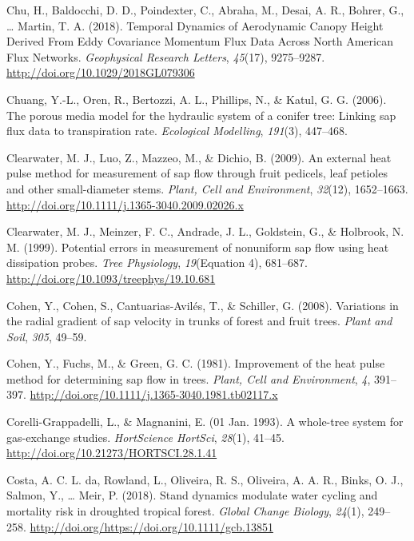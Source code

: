 \documentclass[11pt,twoside]{reedthesis}
\begin{document}
\hypertarget{ref-chu_temporal_2018}{}
Chu, H., Baldocchi, D. D., Poindexter, C., Abraha, M., Desai, A. R.,
Bohrer, G., \ldots{} Martin, T. A. (2018). Temporal Dynamics of
Aerodynamic Canopy Height Derived From Eddy Covariance Momentum Flux
Data Across North American Flux Networks. \emph{Geophysical Research
Letters}, \emph{45}(17), 9275--9287.
\url{http://doi.org/10.1029/2018GL079306}

\hypertarget{ref-Chuang2006}{}
Chuang, Y.-L., Oren, R., Bertozzi, A. L., Phillips, N., \& Katul, G. G.
(2006). The porous media model for the hydraulic system of a conifer
tree: Linking sap flux data to transpiration rate. \emph{Ecological
Modelling}, \emph{191}(3), 447--468.

\hypertarget{ref-Clearwater2009}{}
Clearwater, M. J., Luo, Z., Mazzeo, M., \& Dichio, B. (2009). An
external heat pulse method for measurement of sap flow through fruit
pedicels, leaf petioles and other small-diameter stems. \emph{Plant,
Cell and Environment}, \emph{32}(12), 1652--1663.
\url{http://doi.org/10.1111/j.1365-3040.2009.02026.x}

\hypertarget{ref-Clearwater1999}{}
Clearwater, M. J., Meinzer, F. C., Andrade, J. L., Goldstein, G., \&
Holbrook, N. M. (1999). Potential errors in measurement of nonuniform
sap flow using heat dissipation probes. \emph{Tree Physiology},
\emph{19}(Equation 4), 681--687.
\url{http://doi.org/10.1093/treephys/19.10.681}

\hypertarget{ref-Cohen2008}{}
Cohen, Y., Cohen, S., Cantuarias-Avilés, T., \& Schiller, G. (2008).
Variations in the radial gradient of sap velocity in trunks of forest
and fruit trees. \emph{Plant and Soil}, \emph{305}, 49--59.

\hypertarget{ref-Cohen1981}{}
Cohen, Y., Fuchs, M., \& Green, G. C. (1981). Improvement of the heat
pulse method for determining sap flow in trees. \emph{Plant, Cell and
Environment}, \emph{4}, 391--397.
\url{http://doi.org/10.1111/j.1365-3040.1981.tb02117.x}

\hypertarget{ref-Corelli1993}{}
Corelli-Grappadelli, L., \& Magnanini, E. (01 Jan. 1993). A whole-tree
system for gas-exchange studies. \emph{HortScience HortSci},
\emph{28}(1), 41--45. \url{http://doi.org/10.21273/HORTSCI.28.1.41}

\hypertarget{ref-daCosta2018}{}
Costa, A. C. L. da, Rowland, L., Oliveira, R. S., Oliveira, A. A. R.,
Binks, O. J., Salmon, Y., \ldots{} Meir, P. (2018). Stand dynamics
modulate water cycling and mortality risk in droughted tropical forest.
\emph{Global Change Biology}, \emph{24}(1), 249--258.
\url{http://doi.org/https://doi.org/10.1111/gcb.13851}
\end{document}
